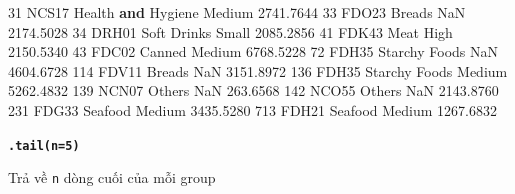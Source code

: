 \documentclass[
]{book}
\newenvironment{Shaded}{\begin{snugshade}}{\end{snugshade}}
\newcommand{\DecValTok}[1]{\textcolor[rgb]{0.00,0.00,0.81}{#1}}
\newcommand{\FloatTok}[1]{\textcolor[rgb]{0.00,0.00,0.81}{#1}}
\newcommand{\KeywordTok}[1]{\textcolor[rgb]{0.13,0.29,0.53}{\textbf{#1}}}
\newcommand{\NormalTok}[1]{#1}
\begin{document}
\begin{Shaded}
\begin{Highlighting}[]
\DecValTok{31}\NormalTok{            NCS17     Health }\KeywordTok{and}\NormalTok{ Hygiene      Medium          }\FloatTok{2741.7644}
\DecValTok{33}\NormalTok{            FDO23                 Breads         NaN          }\FloatTok{2174.5028}
\DecValTok{34}\NormalTok{            DRH01            Soft Drinks       Small          }\FloatTok{2085.2856}
\DecValTok{41}\NormalTok{            FDK43                   Meat        High          }\FloatTok{2150.5340}
\DecValTok{43}\NormalTok{            FDC02                 Canned      Medium          }\FloatTok{6768.5228}
\DecValTok{72}\NormalTok{            FDH35          Starchy Foods         NaN          }\FloatTok{4604.6728}
\DecValTok{114}\NormalTok{           FDV11                 Breads         NaN          }\FloatTok{3151.8972}
\DecValTok{136}\NormalTok{           FDH35          Starchy Foods      Medium          }\FloatTok{5262.4832}
\DecValTok{139}\NormalTok{           NCN07                 Others         NaN           }\FloatTok{263.6568}
\DecValTok{142}\NormalTok{           NCO55                 Others         NaN          }\FloatTok{2143.8760}
\DecValTok{231}\NormalTok{           FDG33                Seafood      Medium          }\FloatTok{3435.5280}
\DecValTok{713}\NormalTok{           FDH21                Seafood      Medium          }\FloatTok{1267.6832}
\end{Highlighting}
\end{Shaded}

\textbf{\texttt{.tail(n=5)}}

Trả về \texttt{n} dòng cuối của mỗi group
\end{document}
